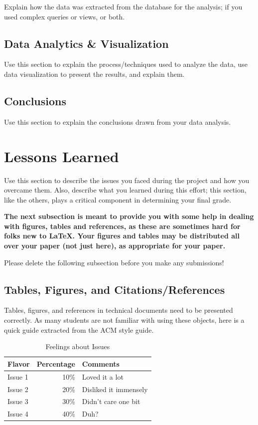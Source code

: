 \documentclass[12pt]{article}
\begin{document}
    Explain how the data was extracted from the database for the analysis; if you used complex queries or views, or both.
    \subsection{Data Analytics \& Visualization}
    Use this section to explain the process/techniques used to analyze the data, use data visualization to present the results, and explain them.
    \subsection{Conclusions}
    Use this section to explain the conclusions drawn from your data analysis.\\
    \section{Lessons Learned}
    Use this section to describe the issues you faced during the project and how you overcame them. Also, describe what you learned during this effort; this section, like the others, plays a critical component in determining your final grade.\\

    {\bf The next subsection is meant to provide you with some help in
    dealing with figures, tables and references, as these are sometimes
    hard for folks new to \LaTeX. Your figures and tables
    may be distributed all over your paper (not just here), as appropriate for your paper.

    Please delete the following subsection before you make any submissions!}

    \subsection{Tables, Figures, and Citations/References}

    Tables, figures, and references in technical
    documents need to be presented correctly. As many students
    are not familiar with using these objects, here is a quick
    guide extracted from the ACM style guide.

    \begin{table}
        \centering
        \caption{Feelings about Issues}
        \label{SAMPLE TABLE}
        \begin{tabular}{|l|r|l|} \hline
        Flavor&Percentage&Comments\\ \hline
        Issue 1 &  10\% & Loved it a lot\\ \hline
        Issue 2 &  20\% & Disliked it immensely\\ \hline
        Issue 3 &  30\% & Didn't care one bit\\ \hline
        Issue 4 &  40\% & Duh?\\ \hline
        \end{tabular}
    \end{table}
\end{document}
